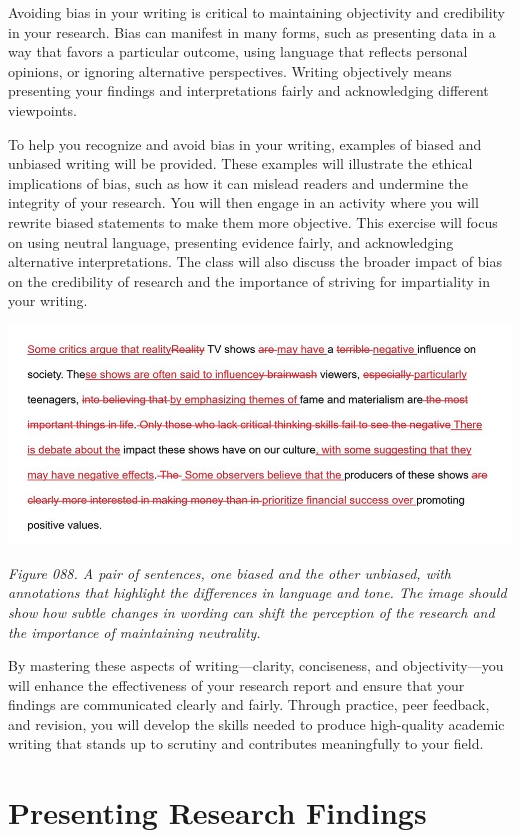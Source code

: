 \documentclass[
]{book}
\begin{document}
Avoiding bias in your writing is critical to maintaining objectivity and credibility in your research. Bias can manifest in many forms, such as presenting data in a way that favors a particular outcome, using language that reflects personal opinions, or ignoring alternative perspectives. Writing objectively means presenting your findings and interpretations fairly and acknowledging different viewpoints.

To help you recognize and avoid bias in your writing, examples of biased and unbiased writing will be provided. These examples will illustrate the ethical implications of bias, such as how it can mislead readers and undermine the integrity of your research. You will then engage in an activity where you will rewrite biased statements to make them more objective. This exercise will focus on using neutral language, presenting evidence fairly, and acknowledging alternative interpretations. The class will also discuss the broader impact of bias on the credibility of research and the importance of striving for impartiality in your writing.

\includegraphics[width=1\textwidth,height=\textheight]{images/fig088.jpg}

\emph{Figure 088. A pair of sentences, one biased and the other unbiased, with annotations that highlight the differences in language and tone. The image should show how subtle changes in wording can shift the perception of the research and the importance of maintaining neutrality.}

By mastering these aspects of writing---clarity, conciseness, and objectivity---you will enhance the effectiveness of your research report and ensure that your findings are communicated clearly and fairly. Through practice, peer feedback, and revision, you will develop the skills needed to produce high-quality academic writing that stands up to scrutiny and contributes meaningfully to your field.

\section{Presenting Research Findings}\label{presenting-research-findings}
\end{document}
